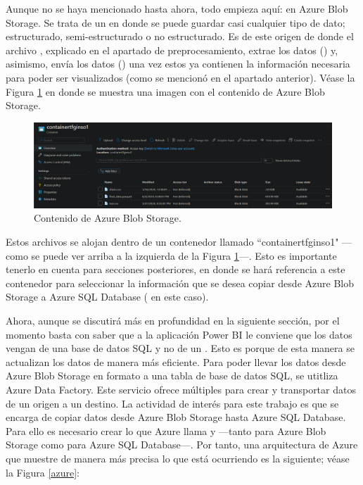 Aunque no se haya mencionado hasta ahora, todo empieza aquí: en Azure Blob Storage. Se trata de un  en donde se puede guardar casi cualquier tipo de dato; estructurado, semi-estructurado o no estructurado. Es de este origen de donde el archivo , explicado en el apartado de preprocesamiento, extrae los datos () y, asimismo, envía los datos () una vez estos ya contienen la información necesaria para poder ser visualizados (como se mencionó en el apartado anterior). Véase la Figura \ref{ABS} en donde se muestra una imagen con el contenido de Azure Blob Storage.

\begin{figure}[H]
	\centering
	\includegraphics[width = 1\textwidth]{imgs/ABS}
	\caption{Contenido de Azure Blob Storage.}
	\label{ABS}
\end{figure}

Estos archivos se alojan dentro de un contenedor llamado ``containertfginso1" ---como se puede ver arriba a la izquierda de la Figura \ref{ABS}---. Esto es importante tenerlo en cuenta para secciones posteriores, en donde se hará referencia a este contenedor para seleccionar la información que se desea copiar desde Azure Blob Storage a Azure SQL Database ( en este caso).


Ahora, aunque se discutirá más en profundidad en la siguiente sección, por el momento basta con saber que a la aplicación Power BI le conviene que los datos vengan de una base de datos SQL y no de un . Esto es porque de esta manera se actualizan los datos de manera más eficiente. Para poder llevar los datos desde Azure Blob Storage en formato  a una tabla de base de datos SQL, se  utitliza Azure Data Factory. Este servicio ofrece múltiples  para crear  y transportar datos de un origen a un destino. La actividad de interés para este trabajo es  que se encarga de copiar datos desde Azure Blob Storage hasta Azure SQL Database. Para ello es necesario crear lo que Azure llama  y  ---tanto para Azure Blob Storage como para Azure SQL Database---. Por tanto, una arquitectura de Azure que muestre de manera más precisa lo que está ocurriendo es la siguiente; véase la  Figura \ref{azure}:


